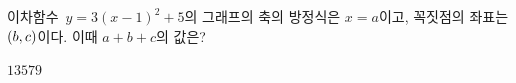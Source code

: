이차함수~$y=3(x-1)^2+5$의 그래프의 축의 방정식은 $x=a$이고, 꼭짓점의 좌표는 $(b{,}\mkern3mu c)$이다. 이때 $a+b+c$의 값은?
\begin{choices32}{$1$}{$3$}{$5$}{$7$}{$9$}\end{choices32}
